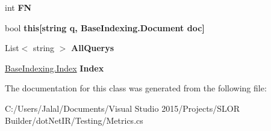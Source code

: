 \begin{DoxyCompactItemize}
\item 
\hypertarget{classdot_net_i_r_1_1_testing_1_1_metrics_ad0e25c27dccd03eee28f313c251a26d3}{}\label{classdot_net_i_r_1_1_testing_1_1_metrics_ad0e25c27dccd03eee28f313c251a26d3} 
int {\bfseries FN}
\item 
\hypertarget{classdot_net_i_r_1_1_testing_1_1_metrics_ac797a25fb1c11f39b06cc8b995e58bfb}{}\label{classdot_net_i_r_1_1_testing_1_1_metrics_ac797a25fb1c11f39b06cc8b995e58bfb} 
bool {\bfseries this\mbox{[}string q, Base\+Indexing.\+Document doc\mbox{]}}
\item 
\hypertarget{classdot_net_i_r_1_1_testing_1_1_metrics_a0af3f158c8c3842271ecb486dc743ff3}{}\label{classdot_net_i_r_1_1_testing_1_1_metrics_a0af3f158c8c3842271ecb486dc743ff3} 
List$<$ string $>$ {\bfseries All\+Querys}
\item 
\hypertarget{classdot_net_i_r_1_1_testing_1_1_metrics_a3b8f45bffba0d42c9df33a6da909884b}{}\label{classdot_net_i_r_1_1_testing_1_1_metrics_a3b8f45bffba0d42c9df33a6da909884b} 
\hyperlink{classdot_net_i_r_1_1_base_indexing_1_1_index}{Base\+Indexing.\+Index} {\bfseries Index}
\end{DoxyCompactItemize}


The documentation for this class was generated from the following file\+:\begin{DoxyCompactItemize}
\item 
C\+:/\+Users/\+Jalal/\+Documents/\+Visual Studio 2015/\+Projects/\+S\+L\+O\+R Builder/dot\+Net\+I\+R/\+Testing/Metrics.\+cs\end{DoxyCompactItemize}
